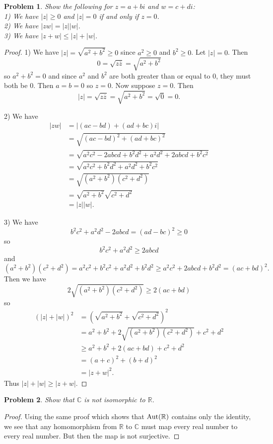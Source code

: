 \documentclass{article}
\newtheorem{problem}{Problem}
\newcommand{\aut}[1]{\textup{Aut}(#1)}
\begin{document}
\begin{flushleft}
\begin{problem}
Show the following for $z = a + bi$ and $w = c + di$:\\
1) We have $|z| \geq 0$ and $|z| = 0$ if and only if $z = 0$.\\
2) We have $|zw| = |z||w|$.\\
3) We have $|z+w| \leq |z| + |w|$.
\end{problem}
\begin{proof}
1) We have $|z| = \sqrt{a^2 + b^2} \geq 0$ since $a^2 \geq 0$ and $b^2 \geq 0$. Let $|z| = 0$. Then
\[
0 = \sqrt{z \overline{z}} = \sqrt{a^2 + b^2}
\]
so $a^2 + b^2 = 0$ and since $a^2$ and $b^2$ are both greater than or equal to $0$, they must both be $0$. Then $a = b = 0$ so $z = 0$. Now suppose $z = 0$. Then
\[
|z| = \sqrt{z \overline{z}} = \sqrt{a^2 + b^2} = \sqrt{0} = 0.
\]\newline

2) We have
\begin{align*}
|zw| &= |(ac-bd) + (ad+bc)i| \\
	&= \sqrt{(ac-bd)^2 + (ad+bc)^2} \\
	&= \sqrt{a^2c^2 -2abcd + b^2d^2 + a^2d^2 + 2abcd + b^2c^2} \\
	&= \sqrt{a^2c^2 + b^2d^2 + a^2d^2 + b^2c^2} \\
	&= \sqrt{(a^2 + b^2)(c^2 + d^2)} \\
	&= \sqrt{a^2 + b^2} \sqrt{c^2 + d^2} \\
	&= |z||w|.
\end{align*}\newline

3) We have
\[
b^2c^2 + a^2d^2 -2abcd = (ad-bc)^2 \geq 0
\]
so
\[
b^2c^2 + a^2d^2 \geq 2abcd
\]
and
\[
(a^2 + b^2)(c^2 + d^2) = a^2c^2 +b^2c^2 + a^2d^2 + b^2d^2 \geq a^2c^2 + 2abcd + b^2d^2 = (ac+bd)^2.
\]
Then we have
\[
2 \sqrt{(a^2 + b^2)(c^2 + d^2)} \geq 2(ac+bd)
\]
so
\begin{align*}
(|z| + |w|)^2 &= (\sqrt{a^2 + b^2} + \sqrt{c^2 + d^2})^2 \\
		   &= a^2 + b^2 + 2 \sqrt{(a^2 + b^2)(c^2 + d^2)} + c^2 + d^2 \\
		   & \geq a^2 + b^2 + 2(ac+bd) + c^2 + d^2 \\
		   &= (a+c)^2 + (b+d)^2 \\
		   &= |z+w|^2.
\end{align*}
Thus $|z| + |w| \geq |z+w|$.
\end{proof}

\begin{problem}
Show that $\mathbb{C}$ is not isomorphic to $\mathbb{R}$.
\end{problem}
\begin{proof}
Using the same proof which shows that $\aut{\mathbb{R}}$ contains only the identity, we see that any homomorphism from $\mathbb{R}$ to $\mathbb{C}$ must map every real number to every real number. But then the map is not surjective.
\end{proof}


\end{flushleft}
\end{document}
